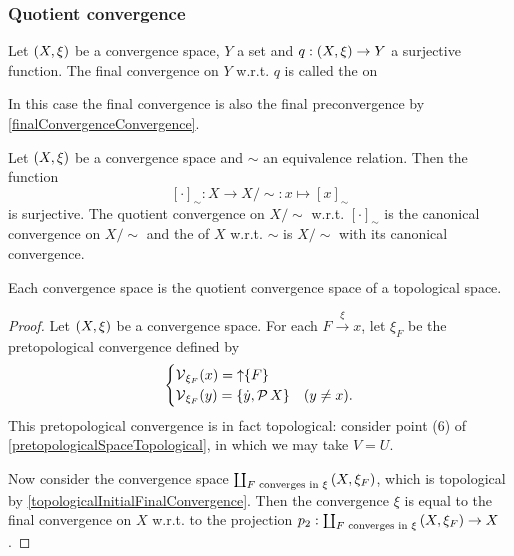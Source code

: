 \subsubsection{Quotient convergence}
\begin{definition}
Let $\left( X,\xi \right)$ be a convergence space, $Y$ a set and $q: \left( X,\xi \right)\to Y$ a surjective function. The final convergence on $Y$ w.r.t. $q$ is called the  on 
\end{definition}

In this case the final convergence is also the final preconvergence by \ref{finalConvergenceConvergence}.

\begin{example}
Let $\left( X,\xi \right)$ be a convergence space and $\sim$ an equivalence relation. Then the function
\[ [\cdot]_\sim: X\to X/{\sim}: x\mapsto [x]_\sim \]
is surjective. The quotient convergence on $X/{\sim}$ w.r.t. $[\cdot]_\sim$ is the canonical convergence on $X/{\sim}$ and the  of $X$ w.r.t. $\sim$ is $X/{\sim}$ with its canonical convergence.
\end{example}

\begin{proposition} \label{convergenceSpaceQuotientOfTopologicalSpace}
Each convergence space is the quotient convergence space of a topological space.
\end{proposition}
\begin{proof}
Let $\left( X,\xi \right)$ be a convergence space. For each $F\overset{\xi}{\longrightarrow} x$, let $\xi_F$ be the pretopological convergence defined by
\[ \begin{cases}
\operatorname{\mathcal{V}}_{\xi_F}(x) = \operatorname{\uparrow}\{F\} \\
\operatorname{\mathcal{V}}_{\xi_F}(y) = \{\dot{y}, \operatorname{\mathcal{P}}{X}\} & (y \neq x).
\end{cases} \]
This pretopological convergence is in fact topological: consider point (6) of \ref{pretopologicalSpaceTopological}, in which we may take $V = U$.

Now consider the convergence space $\coprod_{\text{$F$ converges in $\xi$}}\left( X, \xi_F \right)$, which is topological by \ref{topologicalInitialFinalConvergence}. Then the convergence $\xi$ is equal to the final convergence on $X$ w.r.t. to the projection $p_2: \coprod_{\text{$F$ converges in $\xi$}}\left( X, \xi_F \right) \to X$.
\end{proof}

